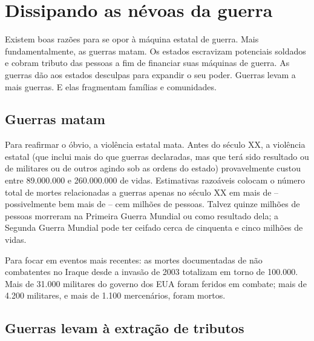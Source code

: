 \section{Dissipando as névoas da guerra}

Existem boas razões para se opor à máquina estatal de guerra. Mais fundamentalmente, as guerras matam. Os estados escravizam potenciais soldados e cobram tributo das pessoas a fim de financiar suas máquinas de guerra. As guerras dão aos estados desculpas para expandir o seu poder. Guerras levam a mais guerras. E elas fragmentam famílias e comunidades.

\subsection*{Guerras matam}

Para reafirmar o óbvio, a violência estatal mata. Antes do século XX, a violência estatal (que inclui mais do que guerras declaradas, mas que terá sido resultado ou de militares ou de outros agindo sob as ordens do estado) provavelmente custou entre 89.000.000 e 260.000.000 de vidas. Estimativas razoáveis colocam o número total de mortes relacionadas a guerras apenas no século XX em mais de -- possivelmente bem mais de -- cem milhões de pessoas. Talvez quinze milhões de pessoas morreram na Primeira Guerra Mundial ou como resultado dela; a Segunda Guerra Mundial pode ter ceifado cerca de cinquenta e cinco milhões de vidas.

Para focar em eventos mais recentes: as mortes documentadas de não combatentes no Iraque desde a invasão de 2003 totalizam em torno de 100.000. Mais de 31.000 militares do governo dos EUA foram feridos em combate; mais de 4.200 militares, e mais de 1.100 mercenários, foram mortos.

\subsection*{Guerras levam à extração de tributos}

